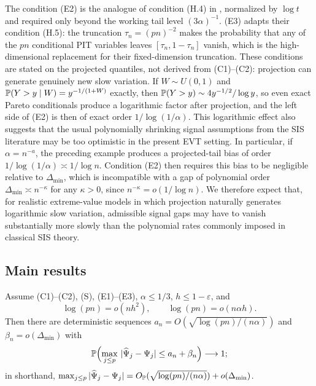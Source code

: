 The condition (E2) is the analogue of condition (H.4) in
\citet{gardesPodgorny2025}, normalized by $\log t$ and required only beyond
the working tail level $(3\alpha)^{-1}$. (E3)
adapts their condition (H.5): the truncation $\tau_n=(pn)^{-2}$ makes the
probability that any of the $pn$ conditional PIT variables leaves
$[\tau_n,1-\tau_n]$ vanish, which is the high-dimensional replacement for
their fixed-dimension truncation. These conditions are stated on the projected quantiles, not derived from
(C1)--(C2): projection can generate genuinely new slow variation. If
$W\sim U(0,1)$ and $\mathbb P(Y>y\mid W)=y^{-1/(1+W)}$ exactly, then
$\mathbb P(Y>y)\sim4y^{-1/2}/\log y$, so even exact Pareto conditionals produce
a logarithmic factor after projection, and the left side of (E2) is then
of exact order $1/\log(1/\alpha)$. This logarithmic effect also suggests that the usual polynomially shrinking signal assumptions from the SIS literature may be too optimistic in the present EVT setting. In particular, if $\alpha=n^{-a}$, the preceding example produces a projected-tail bias of order $1/\log(1/\alpha)\asymp1/\log n$. Condition (E2) then requires this bias to be negligible relative to $\Delta_{\min}$, which is incompatible with a gap of polynomial order $\Delta_{\min}\asymp n^{-\kappa}$ for any $\kappa>0$, since $n^{-\kappa}=o(1/\log n)$. We therefore expect that, for realistic extreme-value models in which projection naturally generates logarithmic slow variation, admissible signal gaps may have to vanish substantially more slowly than the polynomial rates commonly imposed in classical SIS theory.

\subsection{Main results}

\begin{theorem}\label{thm:score}
Assume (C1)--(C2), (S), (E1)--(E3), $\alpha\le1/3$,
$h\le1-\varepsilon$, and
\begin{equation}\label{eq:rate-cond}
 \log(pn)=o(nh^2),
 \qquad
 \log(pn)=o(n\alpha h).
\end{equation}
Then there are deterministic sequences
$a_n=O(\sqrt{\log(pn)/(n\alpha)})$ and $\beta_n=o(\Delta_{\min})$ with
\[
 \mathbb P\Bigl(\max_{j\le p}\,|\widehat\Psi_j-\Psi_j|\le a_n+\beta_n\Bigr)
 \longrightarrow1;
\]
in shorthand,
$\max_{j\le p}|\widehat\Psi_j-\Psi_j|
=O_{\mathbb P}(\sqrt{\log(pn)/(n\alpha)})+o(\Delta_{\min})$.
\end{theorem}

